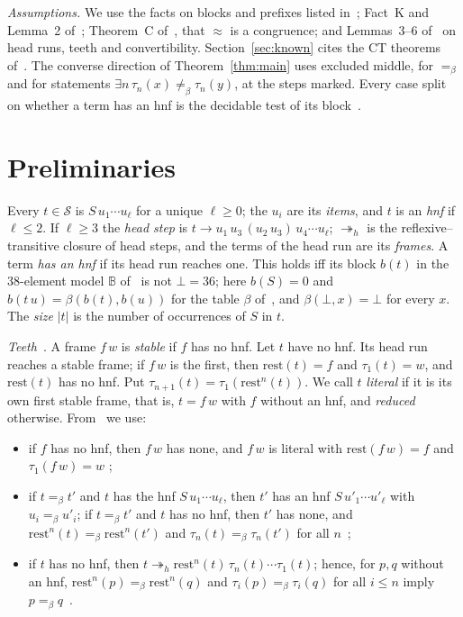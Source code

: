 \documentclass[11pt]{amsart}
\theoremstyle{definition}
\newcommand{\Ter}{\mathcal S}
\newcommand{\hred}{\twoheadrightarrow_h}
\newcommand{\conv}{=_\beta}
\newcommand{\nconv}{\neq_\beta}
\newcommand{\sz}[1]{\lvert#1\rvert}
\newcommand{\rest}{\mathrm{rest}}
\newcommand{\B}{\mathbb B}
\begin{document}
\emph{Assumptions.} We use the facts on blocks and prefixes listed in~\citep[\S2]{s13}; Fact~K and
Lemma~2 of~\citep{s13}; Theorem~C of~\citep{s13}, that $\approx$ is a congruence; and
Lemmas~3--6 of~\citep{s11} on head runs, teeth and convertibility. Section~\ref{sec:known} cites the
CT theorems of~\citep{s11,s12}. The converse direction of Theorem~\ref{thm:main} uses excluded
middle, for $\conv$ and for statements $\exists n\,\tau_n(x)\nconv\tau_n(y)$, at the steps marked.
Every case split on whether a term has an hnf is the decidable test of its block~\citep{s1}.

\section{Preliminaries}\label{sec:prelim}

Every $t\in\Ter$ is $S\,u_1\cdots u_\ell$ for a unique $\ell\ge0$; the $u_i$ are its \emph{items}, and
$t$ is an \emph{hnf} if $\ell\le2$. If $\ell\ge3$ the \emph{head step} is $t\to
u_1\,u_3\,(u_2\,u_3)\,u_4\cdots u_\ell$; $\hred$ is the reflexive--transitive closure of head steps,
and the terms of the head run are its \emph{frames}. A term \emph{has an hnf} if its head run
reaches one. This holds iff its block $b(t)$ in the 38-element model $\B$ of~\citep{s1} is not
$\bot=36$; here $b(S)=0$ and $b(t\,u)=\beta(b(t),b(u))$ for the table $\beta$ of~\citep{s1}, and
$\beta(\bot,x)=\bot$ for every $x$. The \emph{size} $\sz t$ is the number of occurrences of $S$ in
$t$.

\emph{Teeth}~\citep[\S1]{s11}. A frame $f\,w$ is \emph{stable} if $f$ has no hnf. Let $t$ have no hnf.
Its head run reaches a stable frame; if $f\,w$ is the first, then $\rest(t)=f$ and $\tau_1(t)=w$, and
$\rest(t)$ has no hnf. Put $\tau_{n+1}(t)=\tau_1(\rest^n(t))$. We call $t$ \emph{literal} if it is its
own first stable frame, that is, $t=f\,w$ with $f$ without an hnf, and \emph{reduced} otherwise.
From~\citep{s11} we use:
\begin{itemize}
\item[(L1)] if $f$ has no hnf, then $f\,w$ has none, and $f\,w$ is literal with $\rest(f\,w)=f$ and
  $\tau_1(f\,w)=w$ \citep[Lemmas~3(d) and~4(A)]{s11};
\item[(L2)] if $t\conv t'$ and $t$ has the hnf $S\,u_1\cdots u_\ell$, then $t'$ has an hnf
  $S\,u'_1\cdots u'_\ell$ with $u_i\conv u'_i$; if $t\conv t'$ and $t$ has no hnf, then $t'$ has
  none, and $\rest^n(t)\conv\rest^n(t')$ and $\tau_n(t)\conv\tau_n(t')$ for all
  $n$~\citep[Lemma~5]{s11};
\item[(L3)] if $t$ has no hnf, then $t\hred\rest^n(t)\,\tau_n(t)\cdots\tau_1(t)$; hence, for
  $p,q$ without an hnf, $\rest^n(p)\conv\rest^n(q)$ and $\tau_i(p)\conv\tau_i(q)$ for all
  $i\le n$ imply $p\conv q$~\citep[Lemma~6 and its proof]{s11}.
\end{itemize}
\end{document}

